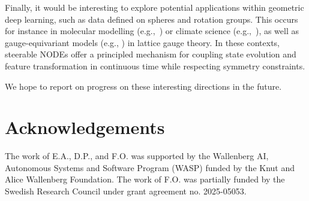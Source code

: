 \documentclass[12pt,a4paper]{article}
\numberwithin{equation}{section}
\theoremstyle{plain}
\theoremstyle{definition}
\theoremstyle{remark}
\begin{document}
Finally, it would be interesting to explore potential applications within geometric deep learning, such as data defined on spheres and rotation groups. This occurs for instance in molecular modelling (e.g.,~\cite{Yim2023,Bose2024}) or climate science (e.g.,~\cite{Linander2025}), as well as gauge-equivariant models (e.g., \cite{Favoni2022,Gerdes2024}) in lattice gauge theory. In these contexts, steerable NODEs offer a principled mechanism for coupling state evolution and feature transformation in continuous time while respecting symmetry constraints. 

We hope to report on progress on these interesting directions in the future. 

\section*{Acknowledgements}
The work of E.A., D.P., and F.O. was supported by the Wallenberg AI, Autonomous Systems and Software Program (WASP) funded by the Knut and Alice Wallenberg Foundation. The work of F.O. was partially funded by the Swedish Research Council under grant agreement no. 2025-05053. 




\newpage
\appendix
\end{document}
